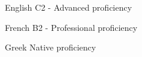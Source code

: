 
\begin{cvskills}

  \cvskill
    {English} %
    {C2 - Advanced proficiency} %

  \cvskill
    {French} %
    {B2 - Professional proficiency} %

  \cvskill
    {Greek} %
    {Native proficiency} %
    
\end{cvskills}
